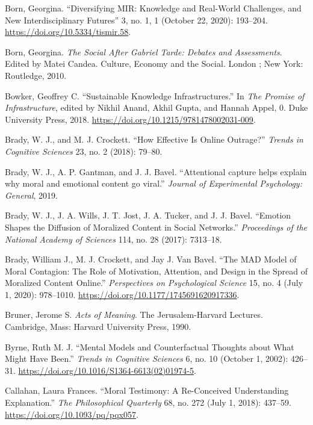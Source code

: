 \documentclass[
  12pt,
]{book}
\newlength{\cslhangindent}
\newenvironment{CSLReferences}[2] %
 {\begin{list}{}{%
  \setlength{\itemindent}{0pt}
  \setlength{\leftmargin}{0pt}
  \setlength{\parsep}{0pt}
  \ifodd #1
   \setlength{\leftmargin}{\cslhangindent}
   \setlength{\itemindent}{-1\cslhangindent}
  \fi
  \setlength{\itemsep}{#2\baselineskip}}}
 {\end{list}}
\theoremstyle{definition}
\theoremstyle{definition}
\theoremstyle{definition}
\theoremstyle{definition}
\theoremstyle{remark}
\begin{document}
\begin{CSLReferences}{1}{0}
Born, Georgina. {``Diversifying {MIR}: {Knowledge} and {Real-World Challenges}, and {New Interdisciplinary Futures}''} 3, no. 1, 1 (October 22, 2020): 193--204. \url{https://doi.org/10.5334/tismir.58}.

Born, Georgina. \emph{The Social After {Gabriel Tarde}: Debates and Assessments}. Edited by Matei Candea. Culture, Economy and the Social. London ; New York: Routledge, 2010.

Bowker, Geoffrey C. {``Sustainable {Knowledge Infrastructures}.''} In \emph{The {Promise} of {Infrastructure}}, edited by Nikhil Anand, Akhil Gupta, and Hannah Appel, 0. Duke University Press, 2018. \url{https://doi.org/10.1215/9781478002031-009}.

Brady, W. J., and M. J. Crockett. {``How Effective Is Online Outrage?''} \emph{Trends in Cognitive Sciences} 23, no. 2 (2018): 79--80.

Brady, W. J., A. P. Gantman, and J. J. Bavel. {``Attentional capture helps explain why moral and emotional content go viral.''} \emph{Journal of Experimental Psychology: General}, 2019.

Brady, W. J., J. A. Wills, J. T. Jost, J. A. Tucker, and J. J. Bavel. {``Emotion Shapes the Diffusion of Moralized Content in Social Networks.''} \emph{Proceedings of the National Academy of Sciences} 114, no. 28 (2017): 7313--18.

Brady, William J., M. J. Crockett, and Jay J. Van Bavel. {``The {MAD} Model of Moral Contagion: The Role of Motivation, Attention, and Design in the Spread of Moralized Content Online.''} \emph{Perspectives on Psychological Science} 15, no. 4 (July 1, 2020): 978--1010. \url{https://doi.org/10.1177/1745691620917336}.

Bruner, Jerome S. \emph{Acts of Meaning}. The {Jerusalem-Harvard} Lectures. Cambridge, Mass: Harvard University Press, 1990.

Byrne, Ruth M. J. {``Mental Models and Counterfactual Thoughts about What Might Have Been.''} \emph{Trends in Cognitive Sciences} 6, no. 10 (October 1, 2002): 426--31. \url{https://doi.org/10.1016/S1364-6613(02)01974-5}.

Callahan, Laura Frances. {``Moral {Testimony}: {A Re-Conceived Understanding Explanation}.''} \emph{The Philosophical Quarterly} 68, no. 272 (July 1, 2018): 437--59. \url{https://doi.org/10.1093/pq/pqx057}.


\end{CSLReferences}
\end{document}
